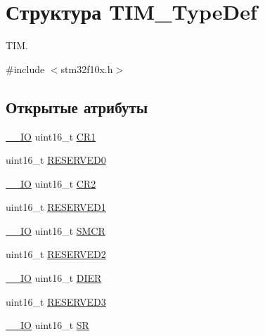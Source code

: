 \hypertarget{struct_t_i_m___type_def}{}\section{Структура T\+I\+M\+\_\+\+Type\+Def}
\label{struct_t_i_m___type_def}


T\+IM.  




{\ttfamily \#include $<$stm32f10x.\+h$>$}

\subsection*{Открытые атрибуты}
\begin{DoxyCompactItemize}
\item 
\mbox{\hyperlink{group___c_m_s_i_s___c_m3__core__definitions_gaec43007d9998a0a0e01faede4133d6be}{\+\_\+\+\_\+\+IO}} uint16\+\_\+t \mbox{\hyperlink{struct_t_i_m___type_def_a410988826004fdd21d55071215144ba9}{C\+R1}}
\item 
uint16\+\_\+t \mbox{\hyperlink{struct_t_i_m___type_def_a88caad1e82960cc6df99d935ece26c1b}{R\+E\+S\+E\+R\+V\+E\+D0}}
\item 
\mbox{\hyperlink{group___c_m_s_i_s___c_m3__core__definitions_gaec43007d9998a0a0e01faede4133d6be}{\+\_\+\+\_\+\+IO}} uint16\+\_\+t \mbox{\hyperlink{struct_t_i_m___type_def_a954eb69fd4e2e6b43ba6c80986f691d8}{C\+R2}}
\item 
uint16\+\_\+t \mbox{\hyperlink{struct_t_i_m___type_def_a59c46ac3a56c6966a7f8f379a2fd1e3e}{R\+E\+S\+E\+R\+V\+E\+D1}}
\item 
\mbox{\hyperlink{group___c_m_s_i_s___c_m3__core__definitions_gaec43007d9998a0a0e01faede4133d6be}{\+\_\+\+\_\+\+IO}} uint16\+\_\+t \mbox{\hyperlink{struct_t_i_m___type_def_a476012f1b4567ffc21ded0b5fd50985e}{S\+M\+CR}}
\item 
uint16\+\_\+t \mbox{\hyperlink{struct_t_i_m___type_def_af62f86f55f2a387518f3de10d916eb7c}{R\+E\+S\+E\+R\+V\+E\+D2}}
\item 
\mbox{\hyperlink{group___c_m_s_i_s___c_m3__core__definitions_gaec43007d9998a0a0e01faede4133d6be}{\+\_\+\+\_\+\+IO}} uint16\+\_\+t \mbox{\hyperlink{struct_t_i_m___type_def_a25b145e57a694bb384eee08fcd107c3a}{D\+I\+ER}}
\item 
uint16\+\_\+t \mbox{\hyperlink{struct_t_i_m___type_def_a8f952613a22049f3ea2b50b7e0d10472}{R\+E\+S\+E\+R\+V\+E\+D3}}
\item 
\mbox{\hyperlink{group___c_m_s_i_s___c_m3__core__definitions_gaec43007d9998a0a0e01faede4133d6be}{\+\_\+\+\_\+\+IO}} uint16\+\_\+t \mbox{\hyperlink{struct_t_i_m___type_def_af686e22c1792dc59dfeffe451d47cf13}{SR}}

\end{DoxyCompactItemize}
